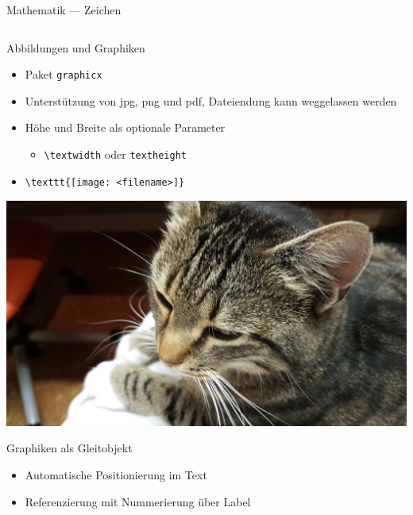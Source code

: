 \documentclass[presentation,aspectratio=169]{beamer}
\begin{document}
\begin{frame}[fragile]{Mathematik --- Zeichen}
  \begin{minipage}{.4\textwidth}
    
  \end{minipage}
  \hfill
  \begin{minipage}{.5\textwidth}
    \inputminted{latex}{codebeispiele/math-symbols.tex}
  \end{minipage}
\end{frame}

\begin{frame}[fragile]{Abbildungen und Graphiken}
  \begin{itemize}
    \item Paket \verb|graphicx|
    \item Unterstützung von jpg, png und pdf, Dateiendung kann weggelassen werden
    \item Höhe und Breite als optionale Parameter
      \begin{itemize}
        \item \verb|\textwidth| oder \verb|textheight|
      \end{itemize}
    \item
      \begin{verbatim}
\texttt{[image: <filename>]}
      \end{verbatim}
  \end{itemize}
  \begin{center}
    \includegraphics[height=.5\textheight]{katze}
  \end{center}
\end{frame}

\begin{frame}{Graphiken als Gleitobjekt}
  \begin{itemize}
    \item Automatische Positionierung im Text
    \item Referenzierung mit Nummerierung über Label
  \end{itemize}
  \begin{minipage}[c]{.4\textwidth}
    
  \end{minipage}
  \hfill
  \begin{minipage}[c]{.5\textwidth}
    \inputminted{latex}{codebeispiele/graphics-figure.tex}
  \end{minipage}
\end{frame}
\end{document}
